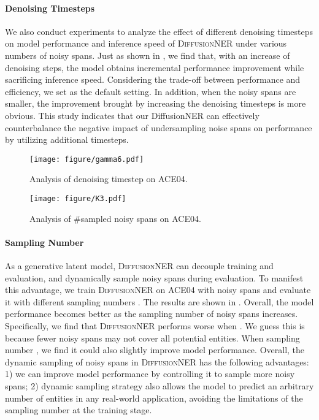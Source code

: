 \documentclass[11pt]{article}
\begin{document}
\paragraph{Denoising Timesteps}
We also conduct experiments to analyze the effect of different denoising timesteps on model performance and inference speed of \textsc{DiffusionNER} under various numbers of noisy spans. Just as shown in , we find that, with an increase of denoising steps, the model obtains incremental performance improvement while sacrificing inference speed. Considering the trade-off between performance and efficiency, we set  as the default setting. In addition, when the noisy spans are smaller, the improvement brought by increasing the denoising timesteps is more obvious. This study indicates that our DiffusionNER can effectively counterbalance the negative impact of undersampling noise spans on performance by utilizing additional timesteps.


\begin{figure}[!htp]
  \centering
\texttt{[image: figure/gamma6.pdf]}
  \caption{Analysis of denoising timestep  on ACE04.}
  \label{fig:gamma}
\end{figure}

\begin{figure}[!htp]
  \centering
  \texttt{[image: figure/K3.pdf]}
  \caption{Analysis of \#sampled noisy spans on ACE04.}
  \label{fig:k}
\end{figure}

\paragraph{Sampling Number} 
As a generative latent model, \textsc{DiffusionNER} can decouple training and evaluation, and dynamically sample noisy spans during evaluation. To manifest this advantage, we train \textsc{DiffusionNER} on ACE04 with  noisy spans and evaluate it with different sampling numbers . The results are shown in . Overall, the model performance becomes better as the sampling number of noisy spans increases. Specifically, we find that \textsc{DiffusionNER} performs worse when . We guess this is because fewer noisy spans may not cover all potential entities. When sampling number , we find it could also slightly improve model performance. Overall, the dynamic sampling of noisy spans in \textsc{DiffusionNER} has the following advantages: 1) we can improve model performance by controlling it to sample more noisy spans; 2) dynamic sampling strategy also allows the model to predict an arbitrary number of entities in any real-world application, avoiding the limitations of the sampling number at the training stage.
\end{document}
